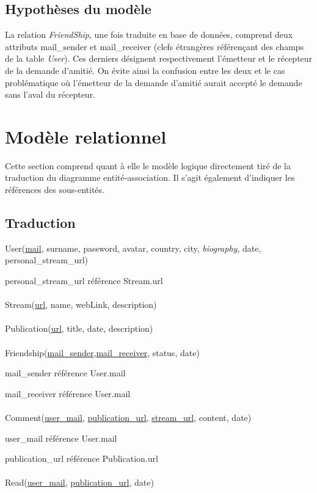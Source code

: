 \documentclass[a4paper,10pt]{article}
\begin{document}
\subsection{Hypothèses du modèle}

La relation \textsl{FriendShip}, une fois traduite en base de données, comprend deux attributs mail\_sender et mail\_receiver (clefs étrangères référençant des champs de la table \textsl{User}). Ces derniers désignent respectivement l'émetteur et le récepteur de la demande d'amitié. On évite ainsi la confusion entre les deux et le cas problématique où l'émetteur de la demande d'amitié aurait accepté le demande sans l'aval du récepteur.

\section{Modèle relationnel}

Cette section comprend quant à elle le modèle logique directement tiré de la traduction du diagramme entité-association. Il s'agit également d'indiquer les références des sous-entités.

\subsection{Traduction}

User(\underline {mail}, surname, password, avatar, country, city, \textsl{biography},  date, personal\_stream\_url)

personal\_stream\_url référence Stream.url
\\\\
Stream(\underline {url}, name, webLink, description)
\\\\
Publication(\underline {url}, title, date, description)
\\\\
Friendship(\underline {mail\_sender},\underline {mail\_receiver}, status, date)

mail\_sender référence User.mail 

mail\_receiver référence User.mail
\\\\
Comment(\underline {user\_mail}, \underline {publication\_url}, \underline {stream\_url}, content, date)

user\_mail référence User.mail

publication\_url référence Publication.url
\\\\
Read(\underline {user\_mail}, \underline {publication\_url}, date)
\end{document}
